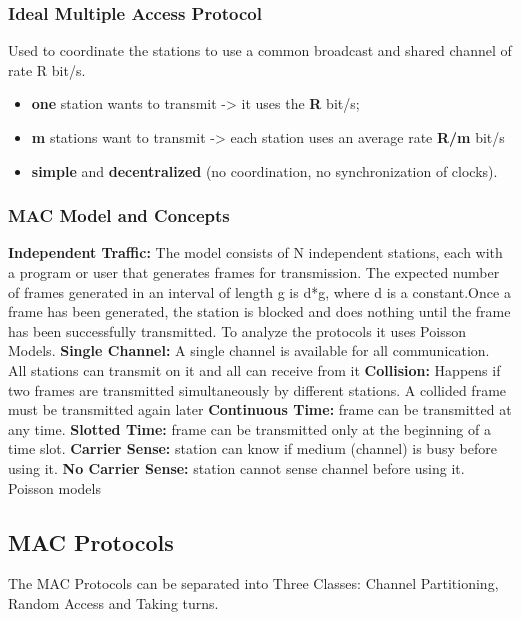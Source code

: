 \documentclass[../resumosRCOM.tex]{subfiles}
\begin{document}
\subsubsection{Ideal Multiple Access Protocol}
Used to coordinate the stations to use a common broadcast and shared channel of rate R bit/s.
\begin{itemize}
    \item \textbf {one} station wants to transmit -> it uses the \textbf {R} bit/s;
    \item \textbf {m} stations want to transmit -> each station uses an average rate \textbf {R/m} bit/s
    \item \textbf {simple} and \textbf {decentralized} (no coordination, no synchronization of clocks). 
\end{itemize}
\subsubsection{MAC Model and Concepts}
\textbf {Independent Traffic:} The model consists of N independent stations, each with a program or user that generates frames for transmission. The expected number of frames generated in an interval of length g is d*g, where d is a constant.Once a frame has been generated, the station is blocked and does nothing until the frame has been successfully transmitted. To analyze the protocols it uses Poisson Models.
\newline
\textbf {Single Channel:} A single channel is available for all communication. All stations can transmit on it and all can receive from it
\newline
\textbf {Collision:} Happens if two frames are transmitted simultaneously by different stations. A collided frame must be transmitted again later
\newline
\textbf {Continuous Time:} frame can be transmitted at any time.
\newline
\textbf {Slotted Time:} frame can be transmitted only at the beginning of a time slot.
\newline
\textbf {Carrier Sense:} station can know if medium (channel) is busy before using it.
\newline
\textbf {No Carrier Sense:} station cannot sense channel before using it.
\newline
Poisson models
\subsection{MAC Protocols}
The MAC Protocols can be separated into Three Classes: Channel Partitioning, Random Access and Taking turns.
\end{document}
